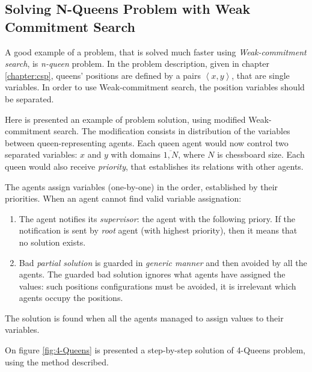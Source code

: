 \documentclass[../ThesisDoc]{subfiles}
\begin{document}
\providecommand{\rootdir}{..}


\subsection{Solving N-Queens Problem with Weak Commitment Search}
\label{sec:N-Queens-WCS}

A good example of a problem, that is solved much faster
using \emph{Weak-commitment search}, is \emph{n-queen} problem.
In the problem description, given in chapter \ref{chapter:csp}, queens' positions
are defined by a pairs $\left<x,y\right>$, that are single variables. In order to
use Weak-commitment search, the position variables should be separated.

Here is presented an example of problem solution, using modified Weak-commitment
search. The modification consists in distribution of the variables between
queen-representing agents. Each queen agent would now control two separated
variables: $x$ and $y$ with domains $\overline{1,N}$, where $N$ is chessboard size.
Each queen would also receive \emph{priority}, that establishes its relations
with other agents.

The agents assign variables (one-by-one) in the order, established by their
priorities. When an agent cannot find valid variable assignation:
\begin{enumerate}
  \item The agent notifies its \emph{supervisor}: the agent with the following priory.
        If the notification is sent by \emph{root} agent (with highest priority),
        then it means that no solution exists.
  \item Bad \emph{partial solution} is guarded in \emph{generic manner} and then
        avoided by all the agents. The guarded bad solution ignores what agents
        have assigned the values: such positions configurations must be avoided,
        it is irrelevant which agents occupy the positions.
\end{enumerate}
The solution is found when all the agents managed to assign values to their
variables.

\medskip\noindent
On figure \ref{fig:4-Queens} is presented a step-by-step solution of 4-Queens problem,
using the method described.






\end{document}
